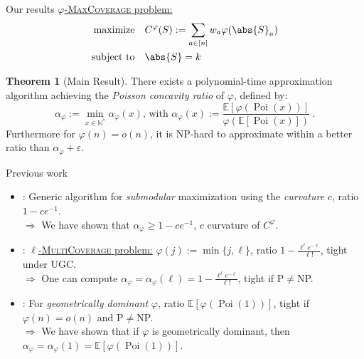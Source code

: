 \documentclass{beamer}
\theoremstyle{definition}
\newtheorem{theo}{Theorem}[section]
\theoremstyle{remark}
\DeclareMathOperator{\Poi}{\text{Poi}}
\DeclareMathOperator{\maxi}{\text{maximize}}
\DeclareMathOperator{\st}{\text{subject to}}
\begin{document}
\begin{frame}{Our results}
  \underline{$\varphi$-\textsc{MaxCoverage} problem:}
    \begin{align*}
      \maxi &&& C^{\varphi}(S) := \sum_{a \in [n]} w_a\varphi(\abs{S}_a)\\
      \st &&& \abs{S} = k
    \end{align*}

  \pause
  
  \begin{theo}[Main Result]
    There exists a polynomial-time approximation algorithm achieving the \emph{Poisson concavity ratio} of $\varphi$, defined by:
    \[ \alpha_{\varphi} := \min_{x \in \mathbb{N}^*} \alpha_{\varphi}(x) \text{, with } \alpha_{\varphi}(x) := \frac{\mathbb{E}[\varphi(\Poi(x))]}{\varphi(\mathbb{E}[\Poi(x)])}\ .\]
    Furthermore for $\varphi(n) = o(n)$, it is \textrm{NP}-hard to approximate within a better ratio than $\alpha_\varphi + \varepsilon$.
  \end{theo}
\end{frame}

\begin{frame}{Previous work}
  \begin{itemize}
  \item \cite{SVW17}: Generic algorithm for \emph{submodular} maximization using the \emph{curvature} $c$, ratio $1-ce^{-1}$.\\
  $\Rightarrow$ We have shown that $\alpha_{\varphi} \geq 1-ce^{-1}$, $c$ curvature of $C^{\varphi}$.
    \pause
    \bigskip
  \item \cite{BFGG20}: \underline{$\ell$-\textsc{MultiCoverage} problem:} $\varphi(j):=\min\{ j,\ell\}$, ratio $1-\frac{\ell^{\ell}e^{-\ell}}{\ell!}$, tight under UGC.\\
  $\Rightarrow$ One can compute $\alpha_{\varphi} = \alpha_{\varphi}(\ell) = 1-\frac{\ell^{\ell}e^{-\ell}}{\ell!}$, tight if \textrm{P}$\not=$\textrm{NP}.
    \pause
    \bigskip
  \item \cite{DMMS20}: For \emph{geometrically dominant} $\varphi$, ratio $\mathbb{E}[\varphi(\Poi(1))]$, tight if $\varphi(n) = o(n)$ and \textrm{P}$\not=$\textrm{NP}.\\
  $\Rightarrow$ We have shown that if $\varphi$ is geometrically dominant, then $\alpha_\varphi=\alpha_\varphi(1)=\mathbb{E}[\varphi(\Poi(1))]$.
  \end{itemize}
\end{frame}
\end{document}
